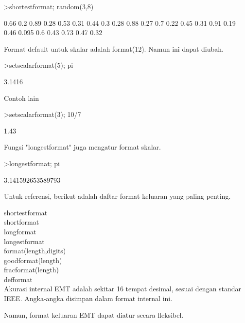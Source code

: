 \documentclass[12pt,arial,letterpaper]{book}
\begin{document}
\begin{eulerprompt}
>shortestformat; random(3,8)
\end{eulerprompt}
\begin{euleroutput}
    0.66    0.2   0.89   0.28   0.53   0.31   0.44    0.3 
    0.28   0.88   0.27    0.7   0.22   0.45   0.31   0.91 
    0.19   0.46  0.095    0.6   0.43   0.73   0.47   0.32 
\end{euleroutput}
\begin{eulercomment}
Format default untuk skalar adalah format(12). Namun ini dapat diubah.
\end{eulercomment}
\begin{eulerprompt}
>setscalarformat(5); pi
\end{eulerprompt}
\begin{euleroutput}
  3.1416
\end{euleroutput}
\begin{eulercomment}
Contoh lain
\end{eulercomment}
\begin{eulerprompt}
>setscalarformat(3); 10/7
\end{eulerprompt}
\begin{euleroutput}
  1.43
\end{euleroutput}
\begin{eulercomment}
Fungsi "longestformat" juga mengatur format skalar.
\end{eulercomment}
\begin{eulerprompt}
>longestformat; pi
\end{eulerprompt}
\begin{euleroutput}
  3.141592653589793
\end{euleroutput}
\begin{eulercomment}
Untuk referensi, berikut adalah daftar format keluaran yang paling
penting.

shortestformat\\
shortformat\\
longformat\\
longestformat\\
format(length,digits)\\
goodformat(length)\\
fracformat(length)\\
defformat\\
Akurasi internal EMT adalah sekitar 16 tempat desimal, sesuai dengan
standar IEEE. Angka-angka disimpan dalam format internal ini.

Namun, format keluaran EMT dapat diatur secara fleksibel.
\end{eulercomment}
\end{document}
